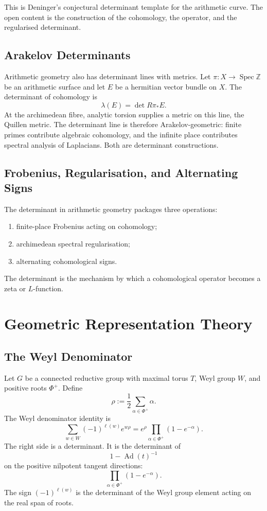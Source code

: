 \documentclass[11pt]{memoir}
\providecommand{\Spec}{\operatorname{Spec}}
\providecommand{\bZ}{\mathbb{Z}}
\begin{document}
This is Deninger's conjectural determinant template for the arithmetic
curve. The open content is the construction of the cohomology, the
operator, and the regularised determinant.

\section{Arakelov Determinants}
\label{sec:arakelov-det}

Arithmetic geometry also has determinant lines with metrics. Let
\(\pi:X\to\Spec\bZ\) be an arithmetic surface and let \(E\) be a
hermitian vector bundle on \(X\). The determinant of cohomology is
\[
  \lambda(E)=\det R\pi_*E.
\]
At the archimedean fibre, analytic torsion supplies a metric on this
line, the Quillen metric. The determinant line is therefore
Arakelov-geometric: finite primes contribute algebraic cohomology, and
the infinite place contributes spectral analysis of Laplacians. Both
are determinant constructions.

\section{Frobenius, Regularisation, and Alternating Signs}
\label{sec:arithmetic-lesson}

The determinant in arithmetic geometry packages three operations:
\begin{enumerate}
\item finite-place Frobenius acting on cohomology;
\item archimedean spectral regularisation;
\item alternating cohomological signs.
\end{enumerate}
The determinant is the mechanism by which a cohomological operator
becomes a zeta or \(L\)-function.

\chapter{Geometric Representation Theory}
\label{ch:grt}

\section{The Weyl Denominator}
\label{sec:weyl-denominator}

Let \(G\) be a connected reductive group with maximal torus \(T\), Weyl
group \(W\), and positive roots \(\Phi^+\). Define
\[
  \rho:=\frac12\sum_{\alpha\in\Phi^+}\alpha.
\]
The Weyl denominator identity is
\[
  \sum_{w\in W}(-1)^{\ell(w)}e^{w\rho}
  =
  e^\rho\prod_{\alpha\in\Phi^+}(1-e^{-\alpha}).
\]
The right side is a determinant. It is the determinant of
\[
  1-\operatorname{Ad}(t)^{-1}
\]
on the positive nilpotent tangent directions:
\[
  \prod_{\alpha\in\Phi^+}(1-e^{-\alpha}).
\]
The sign \((-1)^{\ell(w)}\) is the determinant of the Weyl group
element acting on the real span of roots.
\end{document}

